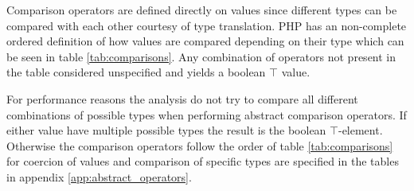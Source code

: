 \begin{table}[htbp]
\centering
{}
\caption{Abstract Modulus}
\label{tab:abstract_modulus1}
\end{table}

Comparison operators are defined directly on values since different types can be compared with each other courtesy of type translation. PHP has an non-complete ordered definition of how values are compared depending on their type which can be seen in table \ref{tab:comparisons}. Any combination of operators not present in the table considered unspecified and yields a boolean $\top$ value. 

For performance reasons the analysis do not try to compare all different combinations of possible types when performing abstract comparison operators. If either value have multiple possible types the result is the boolean $\top$-element. Otherwise the comparison operators follow the order of table \ref{tab:comparisons} for coercion of values and comparison of specific types are specified in the tables in appendix \ref{app:abstract_operators}.


